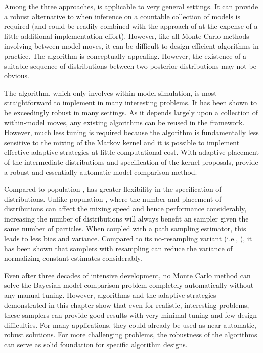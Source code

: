 Among the three approaches, \smc[1] is applicable to very general settings. It can provide a robust alternative to \rjmcmc when inference on a countable collection of models is required (and could be readily combined with the approach of \cite{Jasra:2008bb} at the expense of a little additional implementation effort). However, like all Monte Carlo methods involving between model moves, it can be difficult to design efficient algorithms in practice. The \smc[3] algorithm is conceptually appealing. However, the existence of a suitable sequence of distributions between two posterior distributions may not be obvious.

The \smc[2] algorithm, which only involves within-model simulation, is most straightforward to implement in many interesting problems. It has been shown to be exceedingly robust in many settings. As it depends largely upon a collection of within-model \mcmc moves, any existing \mcmc algorithms can be reused in the \smc[2] framework. However, much less tuning is required because the algorithm is fundamentally less sensitive to the mixing of the Markov kernel and it is possible to implement effective adaptive strategies at little computational cost. With adaptive placement of the intermediate distributions and specification of the \mcmc kernel proposals,  provide a robust and essentially automatic model comparison method.

Compared to population \mcmc, \smc[2] has greater flexibility in the specification of distributions. Unlike population \mcmc, where the number and placement of distributions can affect the mixing speed and hence performance considerably, increasing the number of distributions will always benefit an \smc sampler given the same number of particles. When coupled with a path sampling estimator, this leads to less bias and variance. Compared to its no-resampling variant (i.e., \aic), it has been shown that \smc samplers with resampling can reduce the variance of normalizing constant estimates considerably.

Even after three decades of intensive development, no Monte Carlo method can solve the Bayesian model comparison problem completely automatically without any manual tuning. However, \smc algorithms and the adaptive strategies demonstrated in this chapter show that even for realistic, interesting problems, these samplers can provide good results with very minimal tuning and few design difficulties. For many applications, they could already be used as near automatic, robust solutions. For more challenging problems, the robustness of the algorithms can serve as solid foundation for specific algorithm designs.
